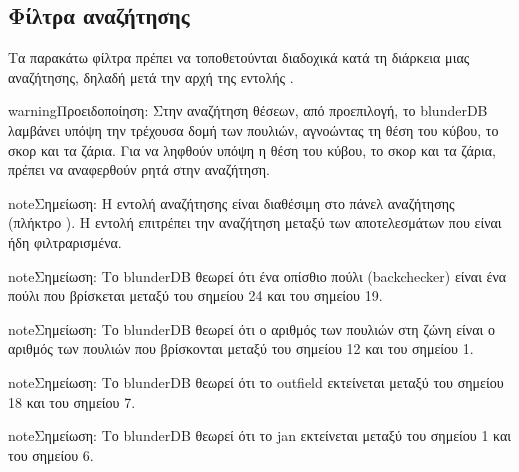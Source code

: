 \documentclass[letterpaper,10pt,greek]{sphinxmanual}
\begin{document}
\subsection{Φίλτρα αναζήτησης}
\label{\detokenize{cmd_mode:filtres-de-recherche}}\label{\detokenize{cmd_mode:cmd-filter}}
\sphinxAtStartPar
Τα παρακάτω φίλτρα πρέπει να τοποθετούνται διαδοχικά κατά τη διάρκεια μιας αναζήτησης, δηλαδή μετά την αρχή της εντολής .

\label{\detokenize{cmd_mode:cmd-filter-pos}}
\begin{sphinxadmonition}{warning}{Προειδοποίηση:}
\sphinxAtStartPar
Στην αναζήτηση θέσεων, από προεπιλογή, το blunderDB λαμβάνει υπόψη την τρέχουσα δομή των πουλιών, αγνοώντας τη θέση του κύβου, το σκορ και τα ζάρια. Για να ληφθούν υπόψη η θέση του κύβου, το σκορ και τα ζάρια, πρέπει να αναφερθούν ρητά στην αναζήτηση.
\end{sphinxadmonition}

\begin{sphinxadmonition}{note}{Σημείωση:}
\sphinxAtStartPar
Η εντολή αναζήτησης  είναι διαθέσιμη στο πάνελ αναζήτησης (πλήκτρο ). Η εντολή  επιτρέπει την αναζήτηση μεταξύ των αποτελεσμάτων που είναι ήδη φιλτραρισμένα.
\end{sphinxadmonition}

\begin{sphinxadmonition}{note}{Σημείωση:}
\sphinxAtStartPar
Το blunderDB θεωρεί ότι ένα οπίσθιο πούλι (backchecker) είναι ένα πούλι που βρίσκεται μεταξύ του σημείου 24 και του σημείου 19.
\end{sphinxadmonition}

\begin{sphinxadmonition}{note}{Σημείωση:}
\sphinxAtStartPar
Το blunderDB θεωρεί ότι ο αριθμός των πουλιών στη ζώνη είναι ο αριθμός των πουλιών που βρίσκονται μεταξύ του σημείου 12 και του σημείου 1.
\end{sphinxadmonition}

\begin{sphinxadmonition}{note}{Σημείωση:}
\sphinxAtStartPar
Το blunderDB θεωρεί ότι το outfield εκτείνεται μεταξύ του σημείου 18 και του σημείου 7.
\end{sphinxadmonition}

\begin{sphinxadmonition}{note}{Σημείωση:}
\sphinxAtStartPar
Το blunderDB θεωρεί ότι το jan εκτείνεται μεταξύ του σημείου 1 και του σημείου 6.
\end{sphinxadmonition}
\end{document}
